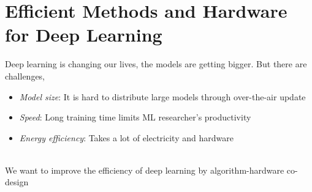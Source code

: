 \section{Efficient Methods and Hardware for Deep Learning}
Deep learning is changing our lives, the models are getting bigger. But there are challenges,
\begin{itemize}
	\item \textit{Model size}: It is hard to distribute large models through over-the-air update
	\item \textit{Speed}: Long training time limits ML researcher's productivity
	\item \textit{Energy efficiency}: Takes a lot of electricity and hardware
\end{itemize}~
\\
We want to improve the efficiency of deep learning by algorithm-hardware co-design

